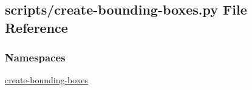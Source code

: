\hypertarget{create-bounding-boxes_8py}{\subsection{scripts/create-\/bounding-\/boxes.py File Reference}
\label{create-bounding-boxes_8py}
}
\subsubsection*{Namespaces}
\begin{DoxyCompactItemize}
\item 
\hyperlink{namespacecreate-bounding-boxes}{create-\/bounding-\/boxes}
\end{DoxyCompactItemize}

